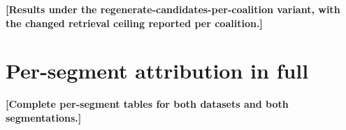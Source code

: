 \documentclass[pdflatex,sn-mathphys-num]{sn-jnl}%
\theoremstyle{thmstyleone}%
\theoremstyle{thmstyletwo}%
\theoremstyle{thmstylethree}%
\newcommand{\tbd}[1]{\textbf{[#1]}}
\begin{document}
\begin{appendices}
\tbd{Results under the regenerate-candidates-per-coalition variant, with the changed retrieval ceiling reported per coalition.}

\section{Per-segment attribution in full}\label{secA5}

\tbd{Complete per-segment tables for both datasets and both segmentations.}

\end{appendices}


\end{document}
